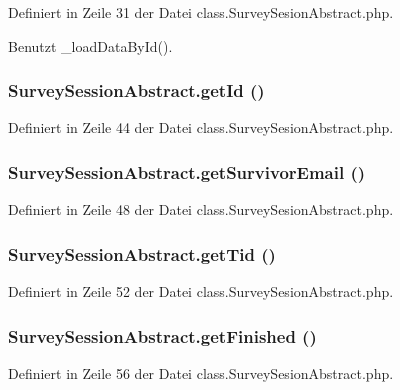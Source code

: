 Definiert in Zeile 31 der Datei class.SurveySesionAbstract.php.

Benutzt \_\-loadDataById().
\subsubsection{\setlength{\rightskip}{0pt plus 5cm}SurveySessionAbstract.getId ()}\label{classSurveySessionAbstract_a7d9a6ad83cb2a401a7cd81bc724df60}




Definiert in Zeile 44 der Datei class.SurveySesionAbstract.php.
\subsubsection{\setlength{\rightskip}{0pt plus 5cm}SurveySessionAbstract.getSurvivorEmail ()}\label{classSurveySessionAbstract_16502ad7242e4b46ce9659d38906337f}




Definiert in Zeile 48 der Datei class.SurveySesionAbstract.php.
\subsubsection{\setlength{\rightskip}{0pt plus 5cm}SurveySessionAbstract.getTid ()}\label{classSurveySessionAbstract_c128a0b3b4af9eec42ffd79dd151bdfe}




Definiert in Zeile 52 der Datei class.SurveySesionAbstract.php.
\subsubsection{\setlength{\rightskip}{0pt plus 5cm}SurveySessionAbstract.getFinished ()}\label{classSurveySessionAbstract_7785e9f725a886777258c23c9cb6923e}




Definiert in Zeile 56 der Datei class.SurveySesionAbstract.php.
